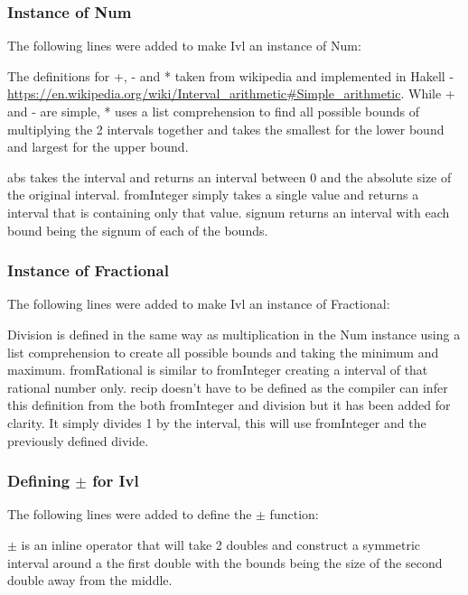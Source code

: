 \documentclass[a4paper]{article}
\begin{document}
\subsubsection{Instance of Num}
The following lines were added to make Ivl an instance of Num:

\par
The definitions for +, - and * taken from wikipedia and implemented in Hakell - \url{https://en.wikipedia.org/wiki/Interval_arithmetic#Simple_arithmetic}.
While + and - are simple, * uses a list comprehension to find all possible bounds of multiplying the 2 intervals together and takes the smallest for the lower bound and largest for the upper bound.
\par
abs takes the interval and returns an interval between 0 and the absolute size of the original interval.
fromInteger simply takes a single value and returns a interval that is containing only that value.
signum returns an interval with each bound being the signum of each of the bounds.

\subsubsection{Instance of Fractional}
The following lines were added to make Ivl an instance of Fractional:

\par
Division is defined in the same way as multiplication in the Num instance using a list comprehension to create all possible bounds and taking the minimum and maximum.
fromRational is similar to fromInteger creating a interval of that rational number only.
recip doesn't have to be defined as the compiler can infer this definition from the both fromInteger and division but it has been added for clarity.
It simply divides 1 by the interval, this will use fromInteger and the previously defined divide.

\subsubsection{Defining \( \pm \) for Ivl}
The following lines were added to define the \( \pm \) function:

\par
\( \pm \) is an inline operator that will take 2 doubles and construct a symmetric interval around a the first double with the bounds being the size of the second double away from the middle.







% 
\end{document}
